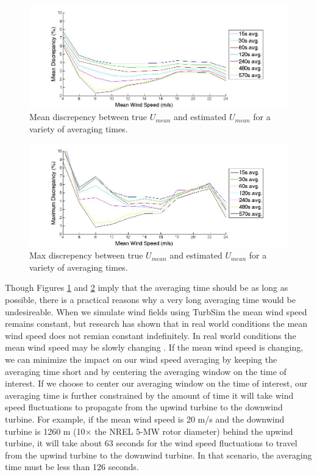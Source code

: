 \begin{figure}[ht]
	\centering
		\includegraphics[width = \linewidth]{Figures/ch2Figures/fig2-26.jpg}
		
	\caption{Mean discrepency between true $U_{mean}$ and estimated $U_{mean}$ for a variety of averaging times.}
	\label{fig2-26}
\end{figure}

\begin{figure}[ht]
	\centering
		\includegraphics[width = \linewidth]{Figures/ch2Figures/fig2-27.jpg}
		
	\caption{Max discrepency between true $U_{mean}$ and estimated $U_{mean}$ for a variety of averaging times.}
	\label{fig2-27}
\end{figure}

Though Figures  \ref{fig2-26} and \ref{fig2-27} imply that the averaging time should be as long as possible, there is a practical reasons why a very long averaging time would be undesireable. When we simulate wind fields using TurbSim the mean wind speed remains constant, but research has shown that in real world conditions the mean wind speed does not remian constant indefinitely. In real world conditions the mean wind speed may be slowly changing \cite{vanderhoven1957}. If the mean wind speed is changing, we can minimize the impact on our wind speed averaging by keeping the averaging time short and by centering the averaging window on the time of interest. If we choose to center our averaging window on the time of interest, our averaging time is further constrained by the amount of time it will take wind speed fluctuations to propagate from the upwind turbine to the downwind turbine. For example, if the mean wind speed is 20 m/s and the downwind turbine is 1260 m (10$\times$ the NREL 5-MW rotor diameter) behind the upwind turbine, it will take about 63 seconds for the wind speed fluctuations to travel from the upwind turbine to the downwind turbine. In that scenario, the averaging time must be less than 126 seconds.

